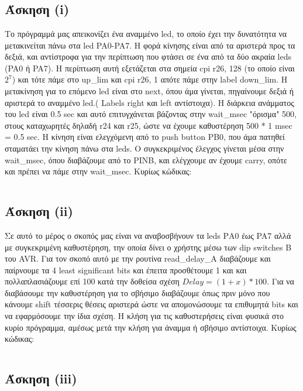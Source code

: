 \documentclass[a4paper,10pt]{article} \usepackage{anysize}
\begin{document}


\section*{} 
\subsection*{Άσκηση (i)}

Το πρόγραμμά μας απεικονίζει ένα αναμμένο led, το οποίο έχει την δυνατότητα να
μετακινείται πάνω στα led PA0-PA7. Η φορά κίνησης είναι από τα αριστερά προς
τα δεξιά, και αντίστροφα για την περίπτωση που φτάσει σε ένα από τα δύο ακραία
leds (PA0 ή PA7). Η περίπτωση αυτή εξετάζεται στα σημεία cpi r26, 128 (το
οποίο είναι $2^7$) και τότε πάμε στο up\_lim και cpi r26, 1 απότε πάμε στην label
down\_lim. Η μετακίνηση για το επόμενο led είναι στο next, όπου άμα γίνεται,
πηγαίνουμε δεξιά ή αριστερά το αναμμένο led.( Labels right και left
αντίστοιχα).  Η διάρκεια ανάμματος του led είναι 0.5 sec και αυτό
επιτυγχάνεται βάζοντας στην wait\_msec "όρισμα" 500, στους καταχωρητές δηλαδή
r24 και r25, ώστε να έχουμε καθυστέρηση 500 * 1 msec = 0.5 sec.  Η κίνηση
είναι ελεγχόμενη από το push button PB0, που άμα πατηθεί σταματάει την κίνηση
πάνω στα leds. Ο συγκεκριμένος έλεγχος γίνεται  μέσα στην wait\_msec, όπου
διαβάζουμε από το PINB, και ελέγχουμε αν έχουμε carry, οπότε και πρέπει να
πάμε στην wait\_msec.
\noindent Κυρίως κώδικας:
\inputminted[linenos,obeytabs,fontsize=\footnotesize]{c}{files/part1.S}
\subsection*{Άσκηση (ii)}

Σε αυτό το μέρος ο σκοπός μας είναι να αναβοσβήνουν τα leds ΡΑ0 έως PA7 αλλά
με συγκεκριμένη καθυστέρηση, την οποία δίνει ο χρήστης μέσω των dip switches B
του AVR. Για τον σκοπό αυτό με την ρουτίνα read\_delay\_A διαβάζουμε και
παίρνουμε τα 4 least significant bits και έπειτα προσθέτουμε 1 και και
πολλαπλασιάζουμε επί 100 κατά την δοθείσα σχέση $Delay = (1+x) * 100$. Για να
διαβάσουμε την καθυστέρηση για το σβήσιμο διαβάζουμε όπως πριν μόνο που
κάνουμε shift τέσσερις θέσεις αριστερά ώστε να απομονώσουμε τα επιθυμητά bits
και να εφαρμόσουμε την ίδια σχέση. Η κλήση για τις καθυστερήσεις είναι φυσικά
στο κυρίο πρόγραμμα, αμέσως μετά την κλήση για άναμμα ή σβήσιμο αντίστοιχα.
\noindent Κυρίως κώδικας:
\inputminted[linenos,obeytabs,fontsize=\footnotesize]{c}{files/part2.S}
\subsection*{Άσκηση (iii)}
\end{document}
